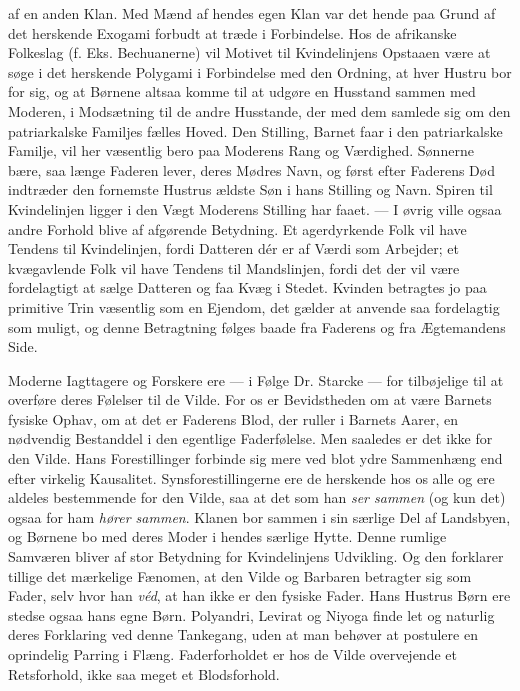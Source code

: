 \documentclass[12pt,a4paper,openany]{book}
\newcommand{\opage}[1]{\marginnote{\footnotesize\textit{[#1]}}}
\begin{document}
af en anden Klan. Med Mænd af hendes egen Klan var det
hende paa Grund af det herskende Exogami forbudt at træde i
Forbindelse. Hos de afrikanske Folkeslag (f. Eks. Bechuanerne)
vil Motivet til Kvindelinjens Opstaaen være at søge i det herskende
Polygami i Forbindelse med den Ordning, at hver Hustru bor for
sig, og at Børnene altsaa komme til at udgøre en Husstand
sammen med Moderen, i Modsætning til de andre Husstande, der
med dem samlede sig om den patriarkalske Familjes fælles Hoved.
Den Stilling, Barnet faar i den patriarkalske Familje, vil her
væsentlig bero paa Moderens Rang og Værdighed. Sønnerne
bære, saa længe Faderen lever, deres Mødres Navn, og først
efter Faderens Død indtræder den fornemste Hustrus ældste Søn
i hans Stilling og Navn. Spiren til Kvindelinjen ligger i den Vægt
Moderens Stilling har faaet. — I øvrig ville ogsaa andre Forhold
blive af afgørende Betydning. Et agerdyrkende Folk vil have
Tendens til Kvindelinjen, fordi Datteren dér er af Værdi som
Arbejder; et kvægavlende Folk vil have Tendens til Mandslinjen,
fordi det der vil være fordelagtigt at sælge Datteren og faa Kvæg
i Stedet. Kvinden betragtes jo paa primitive Trin væsentlig som
en Ejendom, det gælder at anvende saa fordelagtig som muligt,
og denne Betragtning følges baade fra Faderens og fra Ægtemandens
Side.

Moderne Iagttagere og Forskere ere — i Følge Dr. Starcke
— for tilbøjelige til at overføre deres Følelser til de Vilde. For
os er Bevidstheden om at være Barnets fysiske Ophav, om at det
er Faderens Blod, der ruller i Barnets Aarer, en nødvendig Bestanddel
i den egentlige Faderfølelse. Men saaledes er det ikke
for den Vilde. Hans Forestillinger forbinde sig mere ved blot
ydre Sammenhæng end efter virkelig Kausalitet. Synsforestillingerne
ere de herskende hos os alle og ere aldeles bestemmende for den
Vilde, saa at det som han \emph{ser sammen} (og kun det) ogsaa for
ham \emph{hører sammen}. Klanen bor sammen i sin særlige Del af
Landsbyen, og Børnene bo med deres Moder i hendes særlige
Hytte. Denne rumlige Samværen bliver af stor Betydning for
\opage{792}Kvindelinjens Udvikling. Og den forklarer tillige det mærkelige
Fænomen, at den Vilde og Barbaren betragter sig som Fader,
selv hvor han \emph{véd}, at han ikke er den fysiske Fader. Hans
Hustrus Børn ere stedse ogsaa hans egne Børn. Polyandri, Levirat
og Niyoga finde let og naturlig deres Forklaring ved denne Tankegang,
uden at man behøver at postulere en oprindelig Parring i
Flæng. Faderforholdet er hos de Vilde overvejende et Retsforhold,
ikke saa meget et Blodsforhold.
\end{document}
